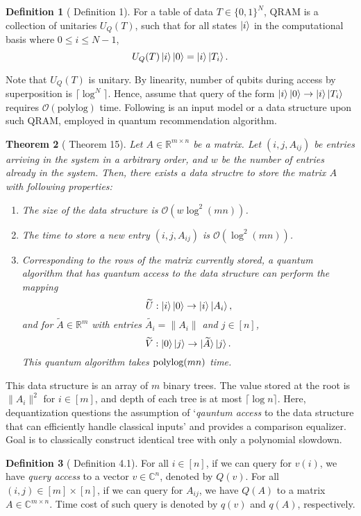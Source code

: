 \documentclass[10pt,twoside,reqno]{amsart} %
\theoremstyle{plain}
\newtheorem{thm}{Theorem}[section]
\theoremstyle{definition}
\newtheorem{defn}[thm]{Definition}
\begin{document}
\begin{defn}[\cite{jaques2023} Definition 1]
  For a table of data $T\in\{0,1\}^N$, 
  QRAM is a collection of unitaries $U_Q(T)$,
  such that for all states $\ket{i}$ in the computational basis
  where $0\leq i\leq N-1$, 
  \[
    U_Q(T)\ket{i}\ket{0} = \ket{i}\ket{T_i}.
  \]
\end{defn}
Note that $U_Q(T)$ is unitary. By linearity, number of qubits during access
by superposition is $\lceil\log^N\rceil$. Hence, assume that query of the
form $\ket{i}\ket{0}\rightarrow\ket{i}\ket{T_i}$ requires 
$\mathcal{O}(\textrm{polylog})$ time. Following is an input model or a data
structure upon such QRAM, employed in quantum recommendation algorithm.
\begin{thm}[\cite{kerenidis2017} Theorem 15]
  Let $A\in\mathbb{R}^{m\times n}$ be a matrix. Let $(i,j,A_{ij})$ be 
  entries arriving in the system in a arbitrary order, and $w$ be the
  number of entries already in the system. Then, there exists a data structre
  to store the matrix $A$ with following properties:
  \begin{enumerate}
    \item The size of the data structure is $\mathcal{O}(w\log^2(mn))$.
    \item The time to store a new entry $(i,j,A_{ij})$ is 
      $\mathcal{O}(\log^2(mn))$.
    \item Corresponding to the rows of the matrix currently stored,
      a quantum algorithm that has quantum access to the data structure
      can perform the mapping 
      \[
        \widetilde{U}:\ket{i}\ket{0}\rightarrow\ket{i}\ket{A_i},
      \]
      and for $\widetilde{A}\in\mathbb{R}^m$ with entries 
      $\widetilde{A_i}=\|A_i\|$ and $j\in[n]$,
      \[
        \widetilde{V}:\ket{0}\ket{j}\rightarrow\ket{\widetilde{A}}\ket{j}.
      \]
      This quantum algorithm takes $\textrm{\normalfont polylog}(mn)$ time.
  \end{enumerate}
\end{thm}
This data structure is an array of $m$  binary trees. The value
stored at the root is $\|A_i\|^2$ for $i\in[m]$, and depth of each tree is
at most $\lceil\log n\rceil$. Here, dequantization questions the assumption
of `\emph{qauntum access} to the data structure that can efficiently handle
classical inputs' and provides a comparison equalizer. Goal is to classically
construct identical tree with only a polynomial slowdown. 
\begin{defn}[\cite{tang2023} Definition 4.1]
  For all $i\in[n]$, if we can query for $v(i)$, we have \emph{query access}
  to a vector $v\in\mathbb{C}^n$, denoted by $Q(v)$. For all 
  $(i,j)\in[m]\times[n]$, if we can query for $A_{ij}$, we have $Q(A)$ to
  a matrix $A\in\mathbb{C}^{m\times n}$. Time cost of such query is denoted
  by $q(v)$ and $q(A)$, respectively.
\end{defn}
\end{document}
